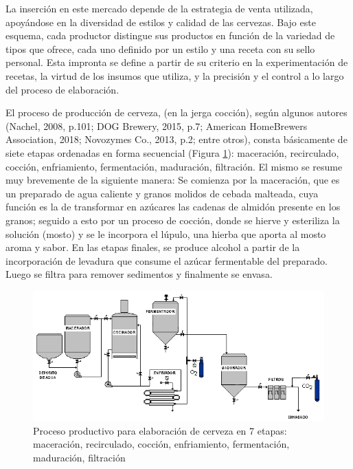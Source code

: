     \par
    La inserción en este mercado depende de la estrategia de venta utilizada, apoyándose en la diversidad de estilos y calidad de las cervezas. Bajo este esquema, cada productor distingue sus productos en función de la variedad de tipos que ofrece, cada uno definido por un estilo y una receta con su sello personal. Esta impronta se define a partir de su criterio en la experimentación de recetas, la virtud de los insumos que utiliza, y la precisión y el control a lo largo del proceso de elaboración.
    \par
    El proceso de producción de cerveza, (en la jerga cocción), según algunos autores (Nachel, 2008, p.101; DOG Brewery, 2015, p.7; American HomeBrewers Association, 2018; Novozymes Co., 2013, p.2; entre otros), consta básicamente de siete etapas ordenadas en forma secuencial (Figura \ref{ProcFab}): maceración, recirculado, cocción, enfriamiento, fermentación, maduración, filtración. El mismo se resume muy brevemente de la siguiente manera: Se comienza por la maceración, que es un preparado de agua caliente y granos molidos de cebada malteada, cuya función es la de transformar en azúcares las cadenas de almidón presente en los granos; seguido a esto por un proceso de cocción, donde se hierve y esteriliza la solución (mosto) y se le incorpora el lúpulo, una hierba que aporta al mosto aroma y sabor. En las etapas finales, se produce alcohol a partir de la incorporación de levadura que consume el azúcar fermentable del preparado. Luego se filtra para remover sedimentos y finalmente se envasa.
    \par
    \begin{figure}[h]
		\centerline{\includegraphics[scale=0.7]{procDeFab.jpg}}
		\caption{Proceso productivo para elaboración de cerveza en 7 etapas: maceración, recirculado, cocción, enfriamiento, fermentación, maduración, filtración}
	    \label{ProcFab}
	\end{figure}
	\par
